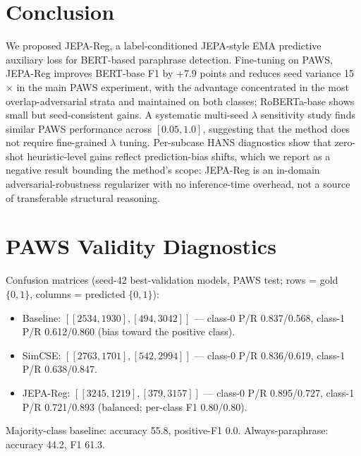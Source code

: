 \documentclass[sigconf]{acmart}
\begin{document}
\section{Conclusion}
We proposed JEPA-Reg, a label-conditioned JEPA-style EMA predictive auxiliary loss for BERT-based paraphrase detection. Fine-tuning on PAWS, JEPA-Reg improves BERT-base F1 by +7.9 points and reduces seed variance 15$\times$ in the main PAWS experiment, with the advantage concentrated in the most overlap-adversarial strata and maintained on both classes; RoBERTa-base shows small but seed-consistent gains. A systematic multi-seed $\lambda$ sensitivity study finds similar PAWS performance across $[0.05, 1.0]$, suggesting that the method does not require fine-grained $\lambda$ tuning. Per-subcase HANS diagnostics show that zero-shot heuristic-level gains reflect prediction-bias shifts, which we report as a negative result bounding the method's scope: JEPA-Reg is an in-domain adversarial-robustness regularizer with no inference-time overhead, not a source of transferable structural reasoning.

\FloatBarrier

\appendix

\section{PAWS Validity Diagnostics}
\label{app:paws}
Confusion matrices (seed-42 best-validation models, PAWS test; rows = gold $\{0,1\}$, columns = predicted $\{0,1\}$):
\begin{itemize}
\item Baseline: $[[2534, 1930], [494, 3042]]$ --- class-0 P/R 0.837/0.568, class-1 P/R 0.612/0.860 (bias toward the positive class).
\item SimCSE: $[[2763, 1701], [542, 2994]]$ --- class-0 P/R 0.836/0.619, class-1 P/R 0.638/0.847.
\item JEPA-Reg: $[[3245, 1219], [379, 3157]]$ --- class-0 P/R 0.895/0.727, class-1 P/R 0.721/0.893 (balanced; per-class F1 0.80/0.80).
\end{itemize}
Majority-class baseline: accuracy 55.8, positive-F1 0.0. Always-paraphrase: accuracy 44.2, F1 61.3.
\end{document}
